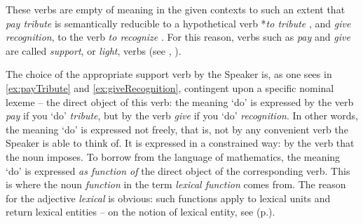 These verbs are empty of meaning in the given contexts to such an extent that \textit{pay tribute} is semantically reducible to a hypothetical verb *\textit{to tribute} , and \textit{give recognition}, to the verb \textit{to recognize} . For this reason, verbs such as \textit{pay} and \textit{give} are called \emph{support}, or \emph{light}, verbs (see , ).

The choice of the appropriate support verb by the Speaker is, as one sees in \ref{ex:payTribute} and \ref{ex:giveRecognition}, contingent upon a specific nomin­al lexeme -- the direct object of this verb: the meaning `do' is ex­pressed by the verb \textit{pay} if you `do' \textit{tribute}, but by the verb \textit{give} if you `do' \textit{recognition}. In other words, the meaning `do' is expressed not freely, that is, not by any convenient verb the Speaker is able to think of. It is expressed in a constrained way: by the verb that the noun imposes. To borrow from the language of mathematics, the meaning `do' is expressed \emph{as function of} the direct object of the corresponding verb. This is where the noun \textit{function} in the term \textit{lexical function} comes from. The reason for the adjective \textit{lexical} is obvious: such functions apply to lexical units and return lexical entities -- on the notion of lexical entity, see  (p.\thinspace\pageref{def:lexicalEntity}).


